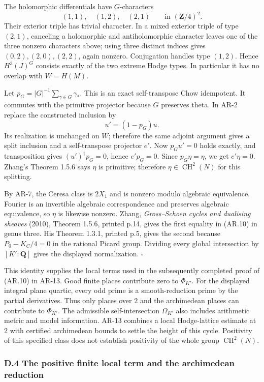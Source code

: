 \documentclass[11pt,a4paper]{article}
\begin{document}
The holomorphic differentials have \(G\)-characters \[
(1,1),\quad(1,2),\quad(2,1)\qquad\text{in }(\mathbf Z/4)^2.
\] Their exterior triple has trivial character. In a mixed exterior
triple of type \((2,1)\), canceling a holomorphic and antiholomorphic
character leaves one of the three nonzero characters above; using three
distinct indices gives \((0,2),(2,0),(2,2)\), again nonzero. Conjugation
handles type \((1,2)\). Hence \(H^3(J)^G\) consists exactly of the two
extreme Hodge types. In particular it has no overlap with \(W=H(M)\).

Let \(p_G=|G|^{-1}\sum_{\gamma\in G}\gamma_*\). This is an exact
self-transpose Chow idempotent. It commutes with the primitive projector
because \(G\) preserves theta. In AR-2 replace the constructed inclusion
by \[
u'=(1-p_G)u.
\] Its realization is unchanged on \(W\); therefore the same adjoint
argument gives a split inclusion and a self-transpose projector \(e'\).
Now \(p_Gu'=0\) holds exactly, and transposition gives
\((u')^\dagger p_G=0\), hence \(e'p_G=0\). Since \(p_G\eta=\eta\), we
get \(e'\eta=0\). Zhang's Theorem 1.5.6 says \(\eta\) is primitive;
therefore \(\eta\in\operatorname{CH}^2(N)\) for this splitting.

By AR-7, the Ceresa class is \(2X_1\) and is nonzero modulo algebraic
equivalence. Fourier is an invertible algebraic correspondence and
preserves algebraic equivalence, so \(\eta\) is likewise nonzero. Zhang,
\emph{Gross--Schoen cycles and dualising sheaves} (2010), Theorem 1.5.6,
printed p.14, gives the first equality in (AR.10) in genus three. His
Theorem 1.3.1, printed p.5, gives the second because \(P_0-K_C/4=0\) in
the rational Picard group. Dividing every global intersection by
\([K':\mathbf Q]\) gives the displayed normalization. \(\square\)

This identity supplies the local terms used in the subsequently
completed proof of (AR.10) in AR-13. Good finite places contribute zero
to \(\Phi_{K'}\). For the displayed integral plane quartic, every odd
prime is a smooth-reduction prime by the partial derivatives. Thus only
places over \(2\) and the archimedean places can contribute to
\(\Phi_{K'}\). The admissible self-intersection \(\Omega_{K'}\) also
includes arithmetic metric and model information. AR-13 combines a local
Hodge-lattice estimate at \(2\) with certified archimedean bounds to
settle the height of this cycle. Positivity of this specified class does
not establish positivity of the whole group \(\operatorname{CH}^2(N)\).

\subsubsection{D.4 The positive finite local term and the archimedean
reduction}\label{d.4-the-positive-finite-local-term-and-the-archimedean-reduction}
\end{document}
